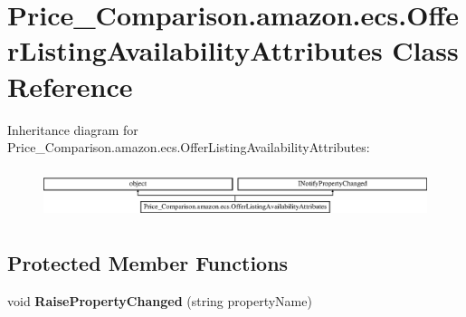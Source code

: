 \hypertarget{class_price___comparison_1_1amazon_1_1ecs_1_1_offer_listing_availability_attributes}{\section{Price\-\_\-\-Comparison.\-amazon.\-ecs.\-Offer\-Listing\-Availability\-Attributes Class Reference}
\label{class_price___comparison_1_1amazon_1_1ecs_1_1_offer_listing_availability_attributes}
}


 


Inheritance diagram for Price\-\_\-\-Comparison.\-amazon.\-ecs.\-Offer\-Listing\-Availability\-Attributes\-:\begin{figure}[H]
\begin{center}
\leavevmode
\includegraphics[height=1.473684cm]{class_price___comparison_1_1amazon_1_1ecs_1_1_offer_listing_availability_attributes}
\end{center}
\end{figure}
\subsection*{Protected Member Functions}
\begin{DoxyCompactItemize}
\item 
\hypertarget{class_price___comparison_1_1amazon_1_1ecs_1_1_offer_listing_availability_attributes_a485133972de1748d3a0b1d8b6a5fc607}{void {\bfseries Raise\-Property\-Changed} (string property\-Name)}\label{class_price___comparison_1_1amazon_1_1ecs_1_1_offer_listing_availability_attributes_a485133972de1748d3a0b1d8b6a5fc607}

\end{DoxyCompactItemize}
